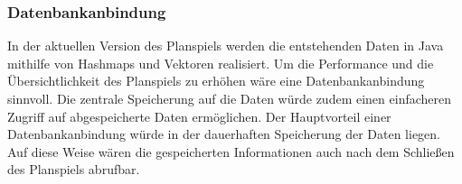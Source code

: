 \subsubsection{Datenbankanbindung}
\label{sec:fazit-spielverlauf-datenbankanbindung}

In der aktuellen Version des Planspiels werden die entstehenden Daten in Java mithilfe von Hashmaps und Vektoren realisiert. Um die Performance und die Übersichtlichkeit des Planspiels zu erhöhen wäre eine Datenbankanbindung sinnvoll. Die zentrale Speicherung auf die Daten würde zudem einen einfacheren Zugriff auf abgespeicherte Daten ermöglichen. Der Hauptvorteil einer Datenbankanbindung würde in der dauerhaften Speicherung der Daten liegen. Auf diese Weise wären die gespeicherten Informationen auch nach dem Schließen des Planspiels abrufbar.